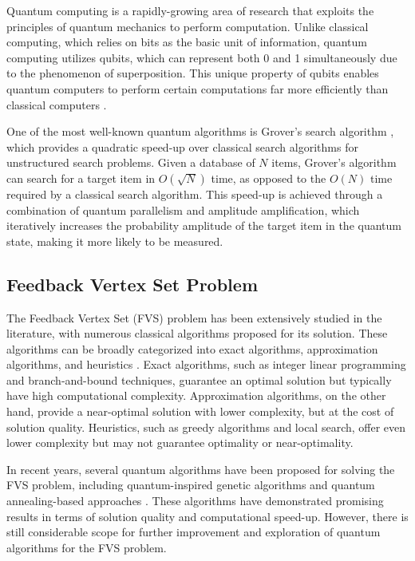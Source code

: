 Quantum computing is a rapidly-growing area of research that exploits the principles of quantum mechanics to perform computation. Unlike classical computing, which relies on bits as the basic unit of information, quantum computing utilizes qubits, which can represent both 0 and 1 simultaneously due to the phenomenon of superposition. This unique property of qubits enables quantum computers to perform certain computations far more efficiently than classical computers \cite{nielsen_chuang}.

One of the most well-known quantum algorithms is Grover's search algorithm \cite{grover}, which provides a quadratic speed-up over classical search algorithms for unstructured search problems. Given a database of $N$ items, Grover's algorithm can search for a target item in $O(\sqrt{N})$ time, as opposed to the $O(N)$ time required by a classical search algorithm. This speed-up is achieved through a combination of quantum parallelism and amplitude amplification, which iteratively increases the probability amplitude of the target item in the quantum state, making it more likely to be measured.

\subsection{Feedback Vertex Set Problem}

The Feedback Vertex Set (FVS) problem has been extensively studied in the literature, with numerous classical algorithms proposed for its solution. These algorithms can be broadly categorized into exact algorithms, approximation algorithms, and heuristics \cite{fvs_algorithms}. Exact algorithms, such as integer linear programming and branch-and-bound techniques, guarantee an optimal solution but typically have high computational complexity. Approximation algorithms, on the other hand, provide a near-optimal solution with lower complexity, but at the cost of solution quality. Heuristics, such as greedy algorithms and local search, offer even lower complexity but may not guarantee optimality or near-optimality.

In recent years, several quantum algorithms have been proposed for solving the FVS problem, including quantum-inspired genetic algorithms \cite{fvs_quantum_genetic} and quantum annealing-based approaches \cite{fvs_quantum_annealing}. These algorithms have demonstrated promising results in terms of solution quality and computational speed-up. However, there is still considerable scope for further improvement and exploration of quantum algorithms for the FVS problem.

